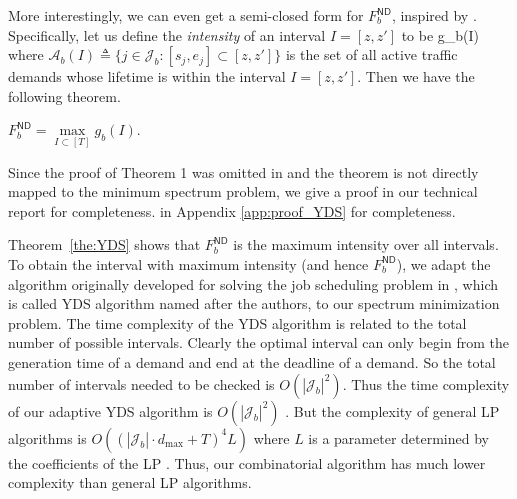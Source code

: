 More interestingly, we can even get a semi-closed form for $F_b^{\textsf{ND}}$, inspired by \cite[Theorem 1]{YDS95}.
Specifically, let us define the \emph{intensity} \cite{YDS95} of an interval $I = [z,z']$
to be
\be
g_b(I) \triangleq {}
\label{equ:intensity_nd_b}
\ee
where
$
\mathcal{A}_b(I) \triangleq \{j \in \mathcal{J}_b:
[s_j, e_j] \subset [z,z']\}
$
is the set of all active traffic demands whose lifetime is within the interval $I=[z,z']$.
Then we have the following theorem.


\begin{theorem}
$F_b^{\textsf{ND}} = \max\limits_{I \subset [T]} g_b(I)$.
\label{the:YDS}
\end{theorem}

\begin{IEEEproof}
Since the proof of Theorem 1 was omitted in \cite{YDS95} and
the theorem is not directly mapped to the minimum spectrum problem,
we give a  proof
\ifx \ISTR \undefined
in our technical report \cite{TR} for completeness.
\else
in Appendix \ref{app:proof_YDS} for completeness.
\fi
\end{IEEEproof}

Theorem~\ref{the:YDS} shows that $F_b^{\textsf{ND}}$ is the maximum intensity over all intervals.
To obtain the interval with maximum intensity (and hence $F_b^{\textsf{ND}}$),
we adapt the  algorithm originally developed for solving the job scheduling problem
in \cite{YDS95}, which is called YDS algorithm named after the authors, to our spectrum minimization problem.
The time complexity
of the YDS algorithm is related to the total number of possible intervals. Clearly
the optimal interval can only begin from the generation time of a demand and end
at the deadline of a demand. So the total number of intervals needed to be checked is $O(|\mathcal{J}_b|^2)$.
Thus the time complexity of our adaptive YDS algorithm is $O(|\mathcal{J}_b|^2)$ \cite{YDS95}.
But the complexity of general LP algorithms is $O((|\mathcal{J}_b| \cdot d_{\max}+T)^4L)$
where $L$ is a parameter determined by the coefficients of the LP \cite{khachiyan1980polynomial}.
Thus, our combinatorial algorithm has much lower complexity than general LP algorithms.
